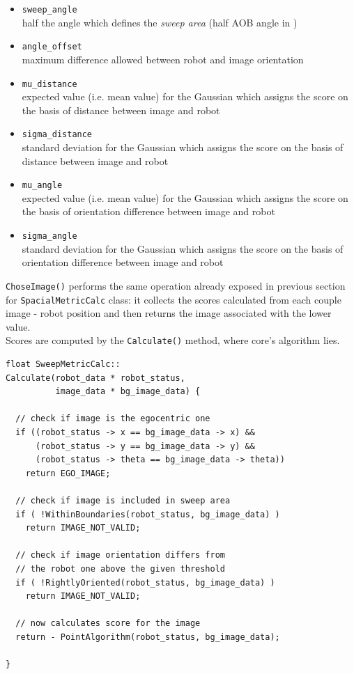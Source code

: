 \begin{itemize}
  \item \texttt{sweep\_angle} \\
    half the angle which defines the \textit{sweep area}
    (half AOB angle in )
  \item \texttt{angle\_offset} \\
    maximum difference allowed between robot and 
    image orientation 
  \item \texttt{mu\_distance} \\
    expected value (i.e. mean value) for the Gaussian 
    which assigns the score on the basis of distance between
    image and robot
  \item \texttt{sigma\_distance} \\
    standard deviation for the Gaussian which assigns the 
    score on the basis of distance between image and robot
  \item \texttt{mu\_angle} \\
    expected value (i.e. mean value) for the Gaussian which 
    assigns the score on the basis of orientation difference
    between image and robot
  \item \texttt{sigma\_angle} \\
    standard deviation for the Gaussian which assigns the 
    score on the basis of orientation difference between image
    and robot
\end{itemize}

\texttt{ChoseImage()} performs the same operation already
exposed in previous section for \texttt{SpacialMetricCalc}
class: it collects the scores calculated from each couple image -
robot position and then returns the image associated with
the lower value.
\\
Scores are computed by the \texttt{Calculate()}
method, where core's algorithm lies.
\\
\begin{lstlisting}[caption={\texttt{SweepMetricCalc::Calculate} method},
    label={code:sweepmetriccalc:calculate}]
float SweepMetricCalc::
Calculate(robot_data * robot_status,
          image_data * bg_image_data) {
  
  // check if image is the egocentric one 
  if ((robot_status -> x == bg_image_data -> x) &&
      (robot_status -> y == bg_image_data -> y) &&
      (robot_status -> theta == bg_image_data -> theta))
    return EGO_IMAGE;

  // check if image is included in sweep area
  if ( !WithinBoundaries(robot_status, bg_image_data) )
    return IMAGE_NOT_VALID;
  
  // check if image orientation differs from
  // the robot one above the given threshold
  if ( !RightlyOriented(robot_status, bg_image_data) )
    return IMAGE_NOT_VALID;
  
  // now calculates score for the image
  return - PointAlgorithm(robot_status, bg_image_data);

}
\end{lstlisting}

